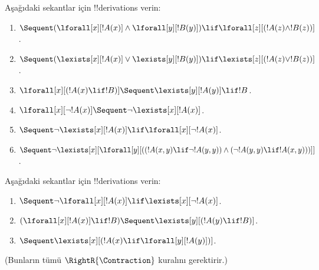 \begin{prob}
Aşağıdaki sekantlar için !!{derivation}s verin:
\begin{enumerate}
\item $\Sequent (\lforall[x][!A(x)] \land \lforall[y][!B(y)]) \lif
\lforall[z][(!A(z) \land !B(z))]$.
\item $\Sequent (\lexists[x][!A(x)] \lor \lexists[y][!B(y)]) \lif
\lexists[z][(!A(z) \lor !B(z))]$.
\item $\lforall[x][(!A(x) \lif !B)] \Sequent \lexists[y][!A(y)] \lif !B$.
\item $\lforall[x][\lnot !A(x)] \Sequent \lnot\lexists[x][!A(x)]$.
\item $\Sequent \lnot\lexists[x][!A(x)] \lif \lforall[x][\lnot !A(x)]$.
\item $\Sequent \lnot\lexists[x][\lforall[y][((!A(x,y) \lif \lnot
!A(y,y)) \land (\lnot !A(y,y) \lif !A(x,y)))]]$.
\end{enumerate}
\end{prob}

\begin{prob}
Aşağıdaki sekantlar için !!{derivation}s verin:
\begin{enumerate}
\item $\Sequent \lnot\lforall[x][!A(x)] \lif \lexists[x][\lnot!A(x)]$.
\item $(\lforall[x][!A(x)] \lif !B) \Sequent \lexists[y][(!A(y) \lif !B)]$.
\item $\Sequent \lexists[x][(!A(x) \lif \lforall[y][!A(y)])]$.
\end{enumerate}
(Bunların tümü $\RightR{\Contraction}$ kuralını gerektirir.)
\end{prob}

